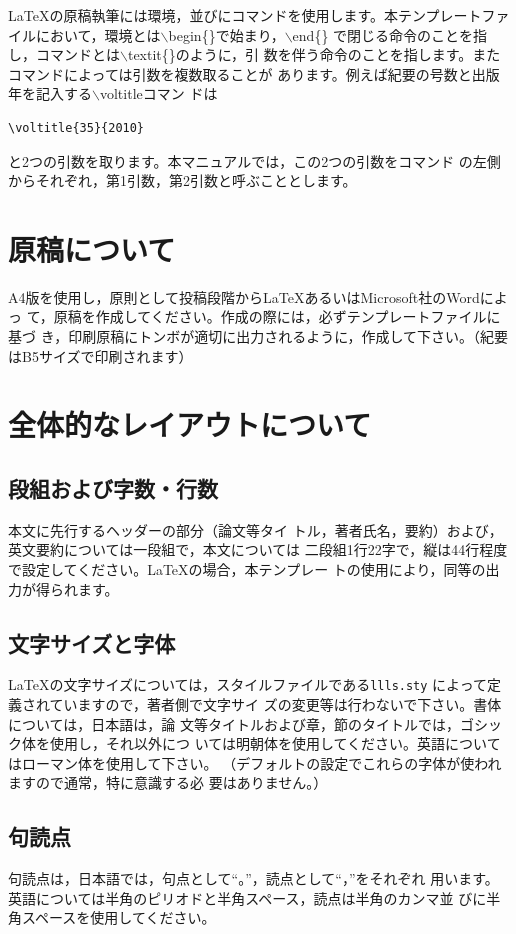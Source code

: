 \documentclass[b5paper,10pt,twocolumn,tombow]{jarticle}
\begin{document}
\LaTeX{}の原稿執筆には環境，並びにコマンドを使用します。本テンプレートファ
イルにおいて，環境とは$\backslash$begin\{\}で始まり，$\backslash$end\{\}
で閉じる命令のことを指し，コマンドとは$\backslash$textit\{\}のように，引
数を伴う命令のことを指します。またコマンドによっては引数を複数取ることが
あります。例えば紀要の号数と出版年を記入する$\backslash$voltitleコマン
ドは
\begin{verbatim}
\voltitle{35}{2010}
\end{verbatim}
と2つの引数を取ります。本マニュアルでは，この2つの引数をコマンド
の左側からそれぞれ，第1引数，第2引数と呼ぶこととします。

\section{原稿について}
A4版を使用し，原則として投稿段階から\LaTeX{}あるいはMicrosoft社のWordによっ
て，原稿を作成してください。作成の際には，必ずテンプレートファイルに基づ
き，印刷原稿にトンボが適切に出力されるように，作成して下さい。（紀要
はB5サイズで印刷されます）

\section{全体的なレイアウトについて}
\subsection{段組および字数・行数}

本文に先行するヘッダーの部分（論文等タイ
トル，著者氏名，要約）および，英文要約については一段組で，本文については
二段組1行22字で，縦は44行程度で設定してください。\LaTeX{}の場合，本テンプレー
トの使用により，同等の出力が得られます。


\subsection{文字サイズと字体}
\LaTeX{}の文字サイズについては，スタイルファイルである\texttt{llls.sty}
によって定義されていますので，著者側で文字サイ
ズの変更等は行わないで下さい。書体については，日本語は，論
文等タイトルおよび章，節のタイトルでは，ゴシック体を使用し，それ以外につ
いては明朝体を使用してください。英語についてはローマン体を使用して下さい。
（デフォルトの設定でこれらの字体が使われますので通常，特に意識する必
要はありません。）

\subsection{句読点}
句読点は，日本語では，句点として``。''，読点として``，''をそれぞれ
用います。英語については半角のピリオドと半角スペース，読点は半角のカンマ並
びに半角スペースを使用してください。
\end{document}
